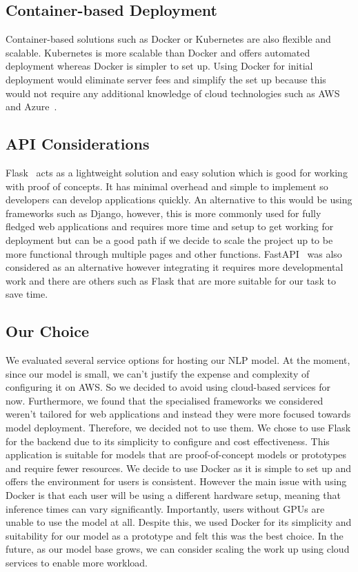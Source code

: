 \documentclass{surreydissertation}
\begin{document}
\subsection{Container-based Deployment}
Container-based solutions such as Docker or Kubernetes are also flexible and scalable. Kubernetes is more scalable than Docker and offers automated deployment whereas Docker is simpler to set up. Using Docker for initial deployment would eliminate server fees and simplify the set up because this would not require any additional knowledge of cloud technologies such as AWS and Azure~\cite{azure}.

\subsection{API Considerations}
Flask~\cite{flask} acts as a lightweight solution and easy solution which is good for working with proof of concepts. It has minimal overhead and simple to implement so developers can develop applications quickly. An alternative to this would be using frameworks such as Django, however, this is more commonly used for fully fledged web applications and requires more time and setup to get working for deployment but can be a good path if we decide to scale the project up to be more functional through multiple pages and other functions. FastAPI~\cite{fastapi} was also considered as an alternative however integrating it requires more developmental work and there are others such as Flask that are more suitable for our task to save time.

\subsection{Our Choice}
We evaluated several service options for hosting our NLP model. At the moment, since our model is small, we can't justify the expense and complexity of configuring it on AWS. So we decided to avoid using cloud-based services for now. Furthermore, we found that the specialised frameworks we considered weren't tailored for web applications and instead they were more focused towards model deployment. Therefore, we decided not to use them. We chose to use Flask for the backend due to its simplicity to configure and cost effectiveness. This application is suitable for models that are proof-of-concept models or prototypes and require fewer resources. We decide to use Docker as it is simple to set up and offers the environment for users is consistent. However the main issue with using Docker is that each user will be using a different hardware setup, meaning that inference times can vary significantly. Importantly, users without GPUs are unable to use the model at all. Despite this, we used Docker for its simplicity and suitability for our model as a prototype and felt this was the best choice. In the future, as our model base grows, we can consider scaling the work up using cloud services to enable more workload. 
\end{document}
